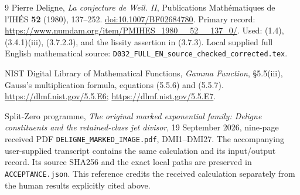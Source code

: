 \documentclass[11pt]{article}
\begin{document}
\begin{thebibliography}{9}
Pierre Deligne, \emph{La conjecture de Weil. II}, Publications
Math\'ematiques de l'IH\'ES \textbf{52} (1980), 137--252.
\href{https://doi.org/10.1007/BF02684780}{doi:10.1007/BF02684780}.
Primary record:
\url{https://www.numdam.org/item/PMIHES_1980__52__137_0/}.
Used: (1.4), (3.4.1)(iii), (3.7.2.3), and the lissity assertion
in (3.7.3). Local supplied full English mathematical source:
\texttt{D032\_FULL\_EN\_source\_checked\_corrected.tex}.

NIST Digital Library of Mathematical Functions,
\emph{Gamma Function}, \S5.5(iii), Gauss's multiplication formula,
equations (5.5.6) and (5.5.7).
\url{https://dlmf.nist.gov/5.5.E6};
\url{https://dlmf.nist.gov/5.5.E7}.

Split-Zero programme, \emph{The original marked exponential family:
Deligne constituents and the retained-class jet divisor},
19 September 2026, nine-page received PDF
\texttt{DELIGNE\_MARKED\_IMAGE.pdf}, DMI1--DMI27.
The accompanying user-supplied transcript contains the same
calculation and its input/output record. Its source SHA256 and
the exact local paths are preserved in \texttt{ACCEPTANCE.json}.
This reference credits the received calculation separately from
the human results explicitly cited above.
\end{thebibliography}
\end{document}

